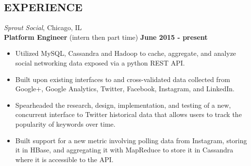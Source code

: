 \documentclass[9pt]{res} %
\begin{document}
\begin{resume}
\section{EXPERIENCE}
\textit{Sprout Social}, Chicago, IL \\
\textbf{Platform Engineer} (intern then part time) \hspace*{\fill} \textbf{June 2015 - present}
\begin{itemize} 
\item Utilized MySQL, Cassandra and Hadoop to cache, aggregate, and analyze social networking data exposed via a python REST API.
\item Built upon existing interfaces to and cross-validated data collected from Google+, Google Analytics, Twitter, Facebook, Instagram, and LinkedIn.
\item Spearheaded the research, design, implementation, and testing of a new, concurrent interface to Twitter historical data that allows users to track the popularity of keywords over time.
\item Built support for a new metric involving polling data from Instagram, storing it in HBase, and aggregating it with MapReduce to store it in Cassandra where it is accessible to the API.
\end{itemize}


\end{resume}
\end{document}
